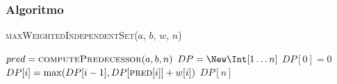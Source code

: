         \subsubsection{Algoritmo}
            \begin{algorithm}[H]
                \caption{\Int \textsc{maxWeightedIndependentSet}(\Int[] $a$, \Int[] $b$, \Int[] $w$, \Int $n$)}
                \begin{algorithmic}
                    \State \Int[] $pred = \Call{computePredecessor}{a,b,n}$
                    \State \Int[] $DP = \New \Int[1\dots n]$
                    \State $DP[0]=0$
                        \State $DP[i]=\max(DP[i-1], DP[\textsc{pred}[i]]+w[i])$
                    \EndFor
                    \State \Return $DP[n]$
                \end{algorithmic}
            \end{algorithm}